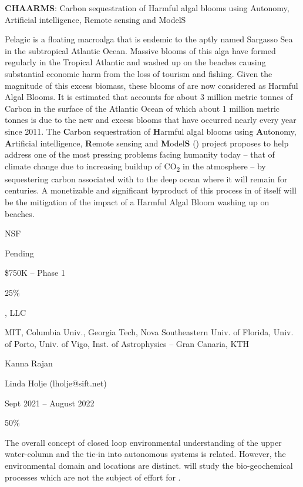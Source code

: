 \vspace{+0.5cm}
\begin{description}[noitemsep,topsep=0pt,parsep=0pt,partopsep=0pt]

\item [Title:] \textbf{CHAARMS}: Carbon sequestration of Harmful algal
  blooms using Autonomy, Artificial intelligence, Remote sensing and
  ModelS

\item [Summary:] Pelagic \sar is a floating macroalga that is endemic to
  the aptly named Sargasso Sea in the subtropical Atlantic Ocean.
  Massive blooms of this alga have formed regularly in the Tropical
  Atlantic and washed up on the beaches causing substantial economic
  harm from the loss of tourism and fishing. Given the magnitude of this
  excess
  biomass, these blooms of \sar are now considered as Harmful Algal
  Blooms. It is estimated that \sar accounts for about 3 million metric
  tonnes of Carbon in the surface of the Atlantic Ocean of which about 1
  million metric tonnes is due to the new and excess blooms that have
  occurred nearly every year since 2011. The \textbf{C}arbon
  sequestration of \textbf{H}armful algal blooms using
  \textbf{A}utonomy, \textbf{A}rtificial intelligence, \textbf{R}emote
  sensing and \textbf{M}odel\textbf{S} (\projce) project proposes to help
  address one of the most pressing problems facing humanity today --
  that of climate change due to increasing buildup of
  CO\textsubscript{2} in the atmosphere -- by sequestering carbon
  associated with \sar to the deep ocean where it will remain for
  centuries. A monetizable and significant byproduct of this process in
  of itself will be the mitigation of the impact of a Harmful Algal
  Bloom washing up on beaches.

\item [Source:] NSF
\item [Status:] Pending
\item [Amount of Funding:] \$750K -- Phase 1
\item [\%-age of effort:] 25\%  
\item [Identity of prime Offeror:] \orge, LLC
\item [Subawardees:] MIT, Columbia Univ., Georgia Tech, Nova
  Southeastern Univ. of Florida, Univ. of Porto, Univ. of Vigo, Inst. of
  Astrophysics -- Gran Canaria, KTH
\item [Technical contact:] Kanna Rajan
\item [Administrative/business contact:] Linda Holje (lholje@sift.net)
\item [Period of performance:] Sept 2021 -- August 2022
\item [Proposed time on \proje:] 50\%
\item [Relationship of proposed project:] The overall concept of closed
  loop environmental understanding of the upper water-column and the
  tie-in into autonomous systems is related. However, the environmental
  domain and locations are distinct. \proj will study the
  bio-geochemical processes which are not the subject of effort for \projce.
  
\end{description}
